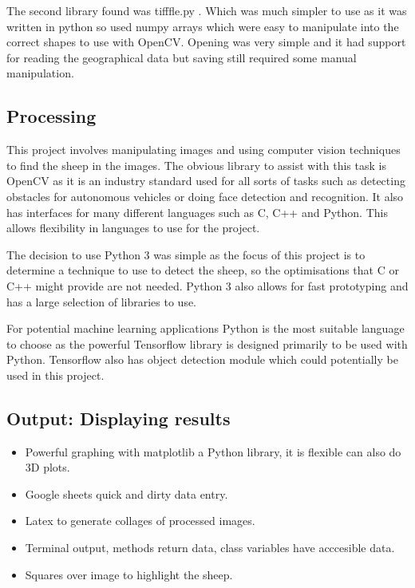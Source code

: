 The second library found was tifffle.py \cite{tifffle}. Which was much simpler to use as it was written in python so used numpy arrays which were easy to manipulate into the correct shapes to use with OpenCV. Opening was very simple and it had support for reading the geographical data but saving still required some manual manipulation.  

\subsection{Processing}
This project involves manipulating images and using computer vision techniques to find the sheep in the images. The obvious library to assist with this task is OpenCV as it is an industry standard used for all sorts of tasks such as detecting obstacles for autonomous vehicles or doing face detection and recognition. It also has interfaces for many different languages such as C, C++ and Python. This allows flexibility in languages to use for the project. 

The decision to use Python 3 was simple as the focus of this project is to determine a technique to use to detect the sheep, so the optimisations that C or C++ might provide are not needed. Python 3 also allows for fast prototyping and has a large selection of libraries to use. 

For potential machine learning applications Python is the most suitable language to choose as the powerful Tensorflow library is designed primarily to be used with Python. Tensorflow also has object detection module which could potentially be used in this project.


\subsection{Output: Displaying results}

\begin{itemize}
    \item Powerful graphing with matplotlib\cite{matplotlib} a Python library, it is flexible can also do 3D plots. 
    \item Google sheets quick and dirty data entry. 
    \item Latex to generate collages of processed images. 
    \item Terminal output, methods return data, class variables have acccesible data.
    \item Squares over image to highlight the sheep.
\end{itemize}




